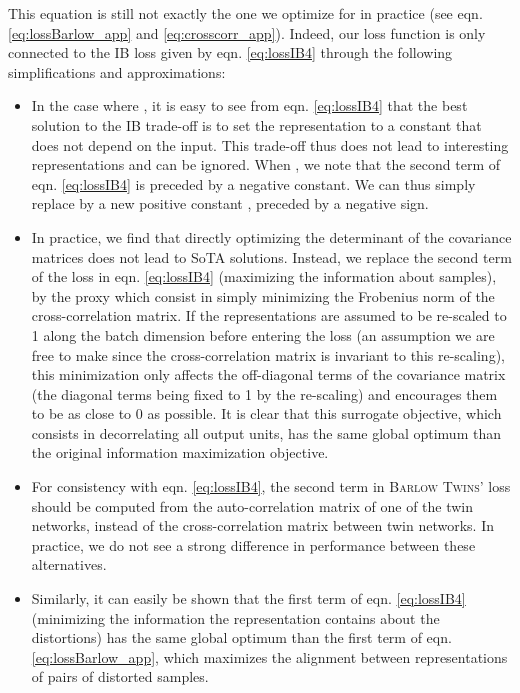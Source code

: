 \documentclass{article}
\newcommand{\AlgoName}{\textsc{Barlow Twins}}
\begin{document}
This equation is still not exactly the one we optimize for in practice (see eqn. \ref{eq:lossBarlow_app} and \ref{eq:crosscorr_app}). Indeed, our loss function is only connected to the IB loss given by eqn. \ref{eq:lossIB4} through the following simplifications and approximations:
\begin{itemize}
  \item In the case where , it is easy to see from eqn. \ref{eq:lossIB4} that the best solution to the IB trade-off is to set the representation to a constant that does not depend on the input. This trade-off thus does not lead to interesting representations and can be ignored. When , we note that the second term of eqn. \ref{eq:lossIB4} is preceded by a negative constant. We can thus simply replace  by a new positive constant , preceded by a negative sign.
  
  \item In practice, we find that directly optimizing the determinant of the covariance matrices does not lead to SoTA solutions. Instead, we replace the second term of the loss in eqn. \ref{eq:lossIB4} (maximizing the information about samples), by the proxy which consist in simply minimizing the Frobenius norm of the cross-correlation matrix. If the representations are assumed to be re-scaled to 1 along the batch dimension before entering the loss (an assumption we are free to make since the cross-correlation matrix is invariant to this re-scaling), this minimization only affects the off-diagonal terms of the covariance matrix
  (the diagonal terms being fixed to 1 by the re-scaling) and encourages them to be as close to 0 as possible. It is clear that this surrogate objective, which consists in decorrelating all output units, has the same global optimum than the original information maximization objective. 
  
  \item For consistency with eqn. \ref{eq:lossIB4}, the second term in \AlgoName' loss should be computed from the auto-correlation matrix of one of the twin networks, instead of the cross-correlation matrix between twin networks. In practice, we do not see a strong difference in performance between these alternatives.
  
  \item Similarly, it can easily be shown that the first term of eqn. \ref{eq:lossIB4} (minimizing the information the representation contains about the distortions) has the same global optimum than the first term of eqn. \ref{eq:lossBarlow_app}, which maximizes the alignment between representations of pairs of distorted samples.  
\end{itemize}
\end{document}

